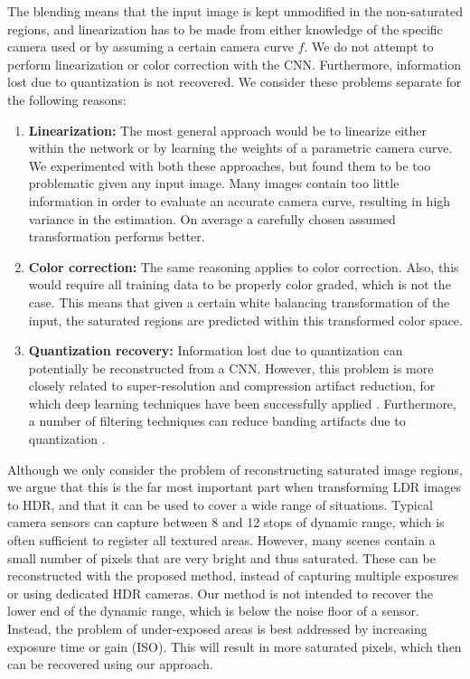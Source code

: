 \documentclass[acmtog]{acmart}
\newcommand{\cc}{f}
\begin{document}
The blending means that the input image is kept unmodified in the non-saturated regions, and linearization has to be made from either knowledge of the specific camera used or by assuming a certain camera curve $\cc$. We do not attempt to perform linearization or color correction with the CNN. Furthermore, information lost due to quantization is not recovered. We consider these problems separate for the following reasons:
\begin{enumerate}
	\item {\bf Linearization:} The most general approach would be to linearize either within the network or by learning the weights of a parametric camera curve. We experimented with both these approaches, but found them to be too problematic given any input image. Many images contain too little information in order to evaluate an accurate camera curve, resulting in high variance in the estimation. On average a carefully chosen assumed transformation performs better. 
	\item {\bf Color correction:} The same reasoning applies to color correction. Also, this would require all training data to be properly color graded, which is not the case. This means that given a certain white balancing transformation of the input, the saturated regions are predicted within this transformed color space.
	\item {\bf Quantization recovery:} Information lost due to quantization can potentially be reconstructed from a CNN. However, this problem is more closely related to super-resolution and compression artifact reduction, for which deep learning techniques have been successfully applied \cite{Dong2015,Ledig2016,Svoboda2016}. Furthermore, a number of filtering techniques can reduce banding artifacts due to quantization \cite{Daly2004,Bhagavathy2007}.
\end{enumerate}

\noindent Although we only consider the problem of reconstructing saturated image regions, we argue that this is the far most important part when transforming LDR images to HDR, and that it can be used to cover a wide range of situations. Typical camera sensors can capture between 8 and 12 stops of dynamic range, which is often sufficient to register all textured areas. However, many scenes contain a small number of pixels that are very bright and thus saturated. These can be reconstructed with the proposed method, instead of capturing multiple exposures or using dedicated HDR cameras. Our method is not intended to recover the lower end of the dynamic range, which is below the noise floor of a sensor. Instead, the problem of under-exposed areas is best addressed by increasing exposure time or gain (ISO). This will result in more saturated pixels, which then can be recovered using our approach.
\end{document}

